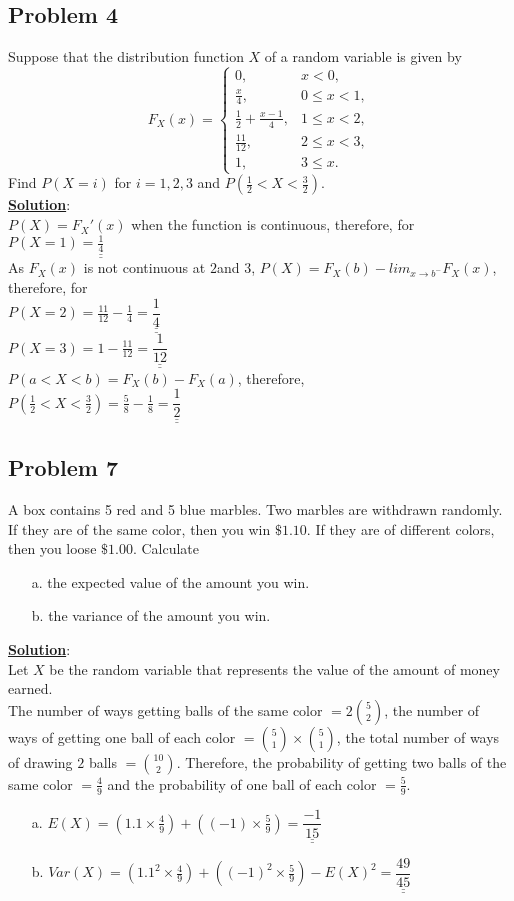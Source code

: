 \documentclass[11pt,letter paper]{report}
\begin{document}
\subsection*{Problem 4}
Suppose that the distribution function $X$ of a random variable is given by
$$F_X(x)=
\begin{cases}
0,& x<0,\\
\frac{x}{4},& 0\leq x<1,\\
\frac{1}{2}+\frac{x-1}{4},& 1\leq x<2,\\
\frac{11}{12},&2\leq x<3,\\
1,&3\leq x.
\end{cases}$$
Find $P(X=i)$ for $i=1,2,3$ and $P(\frac{1}{2}<X<\frac{3}{2})$.\\[0.1cm]
{\bf \underline{Solution}}:\\
$P(X)=F_X'(x)$ when the function is continuous, therefore, for\\
$P(X=1)=\underline{\underline{\frac{1}{4}}}$\\
As $F_X(x)$ is not continuous at $2$and $3$, $P(X)=F_X(b)-lim_{x\to b^-}F_X(x)$, therefore, for\\
$P(X=2)=\frac{11}{12}-\frac{1}{4}=\underline{\underline{\dfrac{1}{4}}}$\\
$P(X=3)=1-\frac{11}{12}=\underline{\underline{\dfrac{1}{12}}}$\\
$P(a<X<b)=F_X(b)-F_X(a)$, therefore,\\ 
$P(\frac{1}{2}<X<\frac{3}{2})=\frac{5}{8}-\frac{1}{8}=\underline{\underline{\dfrac{1}{2}}}$

\subsection*{Problem 7}
A box contains 5 red and 5 blue marbles. Two marbles are withdrawn randomly. If they are of the same color, then you win $\$1.10$. If they are of different colors, then you loose $\$1.00$. Calculate
\begin{itemize} 
\item[a.] the expected value of the amount you win.
\item[b.] the variance of the amount you win.
\end{itemize}
{\bf \underline{Solution}}:\\
Let $X$ be the random variable that represents the value of the amount of money earned.\\
The number of ways getting balls of the same color $=2\binom{5}{2}$, the number of ways of getting one ball of each color $=\binom{5}{1}\times \binom{5}{1}$, the total number of ways of drawing $2$ balls $=\binom{10}{2}$. Therefore, the probability of getting two balls of the same color $=\frac{4}{9}$ and the probability of one ball of each color $=\frac{5}{9}$. 
\begin{itemize} 
\item[a.] $E(X)=(1.1\times \frac{4}{9})+((-1)\times \frac{5}{9})=\underline{\underline{\dfrac{-1}{15}}}$
\item[b.] $Var(X)=(1.1^2\times \frac{4}{9})+((-1)^2\times \frac{5}{9})-E(X)^2=\underline{\underline{\dfrac{49}{45}}}$
\end{itemize}
\end{document}
